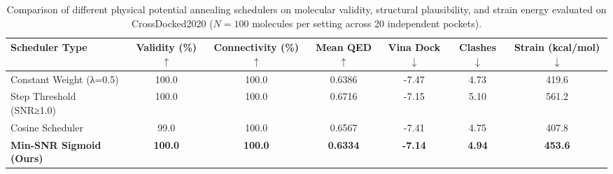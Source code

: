 
\begin{table}[t]
\centering
\small
\caption{Comparison of different physical potential annealing schedulers on molecular validity, structural plausibility, and strain energy evaluated on CrossDocked2020 ($N=100$ molecules per setting across 20 independent pockets).}
\label{tab:sensitivity_schedulers}
\begin{tabular}{lcccccc}
\toprule
\textbf{Scheduler Type} & \textbf{Validity (\%)} $\uparrow$ & \textbf{Connectivity (\%)} $\uparrow$ & \textbf{Mean QED} $\uparrow$ & \textbf{Vina Dock} $\downarrow$ & \textbf{Clashes} $\downarrow$ & \textbf{Strain (kcal/mol)} $\downarrow$ \\
\midrule
Constant Weight (λ=0.5) & 100.0 & 100.0 & 0.6386 & -7.47 & 4.73 & 419.6 \\
Step Threshold (SNR≥1.0) & 100.0 & 100.0 & 0.6716 & -7.15 & 5.10 & 561.2 \\
Cosine Scheduler & 99.0 & 100.0 & 0.6567 & -7.41 & 4.75 & 407.8 \\
\textbf{Min-SNR Sigmoid (Ours)} & \textbf{100.0} & \textbf{100.0} & \textbf{0.6334} & \textbf{-7.14} & \textbf{4.94} & \textbf{453.6} \\
\bottomrule
\end{tabular}
\end{table}
